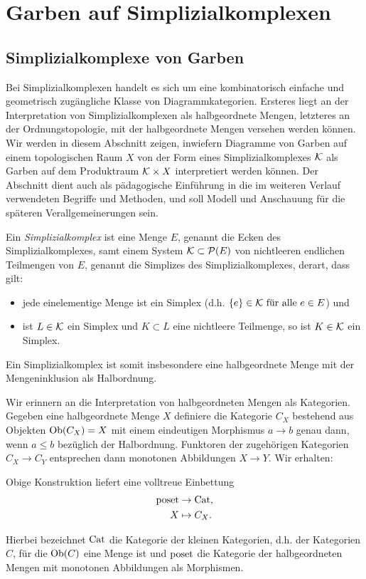 
\chapter{Garben auf Simplizialkomplexen}
\label{ch:simp-comp}

\section{Simplizialkomplexe von Garben}
\label{sec:simp-comp-sheaf}

Bei Simplizialkomplexen handelt es sich um eine kombinatorisch
einfache und geometrisch zugängliche Klasse von
Diagrammkategorien. Ersteres liegt an der Interpretation von
Simplizialkomplexen als halbgeordnete Mengen, letzteres an der
Ordnungstopologie, mit der halbgeordnete Mengen versehen werden
können. Wir werden in diesem Abschnitt zeigen, inwiefern Diagramme von
Garben auf einem topologischen Raum $X$ von der Form eines
Simplizialkomplexes $\mathcal{K}$ als Garben auf dem Produktraum $\mathcal{K} \times X$
interpretiert werden können. Der Abschnitt dient auch als pädagogische
Einführung in die im weiteren Verlauf verwendeten Begriffe und
Methoden, und soll Modell und Anschauung für die späteren
Verallgemeinerungen sein.
\begin{defn}
  Ein \emph{Simplizialkomplex} ist eine Menge $E$, genannt die Ecken
  des Simplizialkomplexes, samt einem System $ \mathcal{K} \subset
  \mathcal{P}(E) $ von nichtleeren endlichen Teilmengen von $E$,
  genannt die Simplizes des Simplizialkomplexes, derart, dass gilt:
  \begin{itemize}
  \item jede einelementige Menge ist ein Simplex (d.h. $\{e\} \in
    \mathcal{K} \text{ für alle } e \in E$) und
  \item ist $L \in \mathcal{K}$ ein Simplex und $K \subset L$ eine
    nichtleere Teilmenge, so ist $K \in \mathcal{K}$ ein Simplex.
  \end{itemize}
\end{defn}
Ein Simplizialkomplex ist somit insbesondere eine halbgeordnete Menge
mit der Mengeninklusion als Halbordnung.

Wir erinnern an die Interpretation von halbgeordneten Mengen als
Kategorien. Gegeben eine halbgeordnete Menge $X$ definiere die
Kategorie $C_X$ bestehend aus Objekten $\operatorname{Ob}(C_X) = X$ mit einem
eindeutigen Morphismus $a \to b$ genau dann, wenn $a \leq b$ bezüglich
der Halbordnung. Funktoren der zugehörigen Kategorien $C_X \to C_Y$
entsprechen dann monotonen Abbildungen $X \to Y$. Wir erhalten:
\begin{lemma} \label{poset-cat}
  Obige Konstruktion liefert eine volltreue Einbettung
  \begin{align*}
    \operatorname{poset} &\to \operatorname{Cat}, \\
    X &\mapsto C_X.    
  \end{align*}
\end{lemma}
Hierbei bezeichnet $\operatorname{Cat}$ die Kategorie der kleinen Kategorien,
d.h. der Kategorien $C$, für die $\operatorname{Ob}(C)$ eine Menge ist und $\operatorname{poset}$
die Kategorie der halbgeordneten Mengen mit monotonen Abbildungen als
Morphismen.

